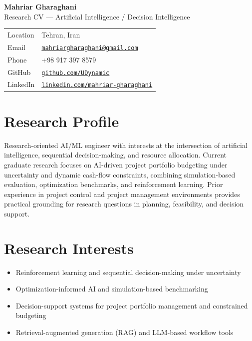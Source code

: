 \documentclass[11pt,a4paper]{article}
\begin{document}
{\LARGE \textbf{Mahriar Gharaghani}}\\[-2pt]
{\color{gray}Research CV --- Artificial Intelligence / Decision Intelligence}\\[6pt]

\begin{tabularx}{\textwidth}{@{}p{3cm}Y@{}}
Location & Tehran, Iran \\
Email & \href{mailto:mahriargharaghani@gmail.com}{\texttt{mahriargharaghani@gmail.com}} \\
Phone & +98 917 397 8579 \\
GitHub & \href{https://github.com/UDynamic}{\texttt{github.com/UDynamic}} \\
LinkedIn & \href{https://linkedin.com/mahriar-gharaghani}{\texttt{linkedin.com/mahriar-gharaghani}} \\
\end{tabularx}

\section*{Research Profile}
Research-oriented AI/ML engineer with interests at the intersection of artificial intelligence,
sequential decision-making, and resource allocation.
Current graduate research focuses on AI-driven project portfolio budgeting under uncertainty and dynamic cash-flow constraints,
combining simulation-based evaluation, optimization benchmarks, and reinforcement learning.
Prior experience in project control and project management environments provides practical grounding
for research questions in planning, feasibility, and decision support.

\section*{Research Interests}
\begin{itemize}
    \item Reinforcement learning and sequential decision-making under uncertainty
    \item Optimization-informed AI and simulation-based benchmarking
    \item Decision-support systems for project portfolio management and constrained budgeting
    \item Retrieval-augmented generation (RAG) and LLM-based workflow tools
\end{itemize}
\end{document}
